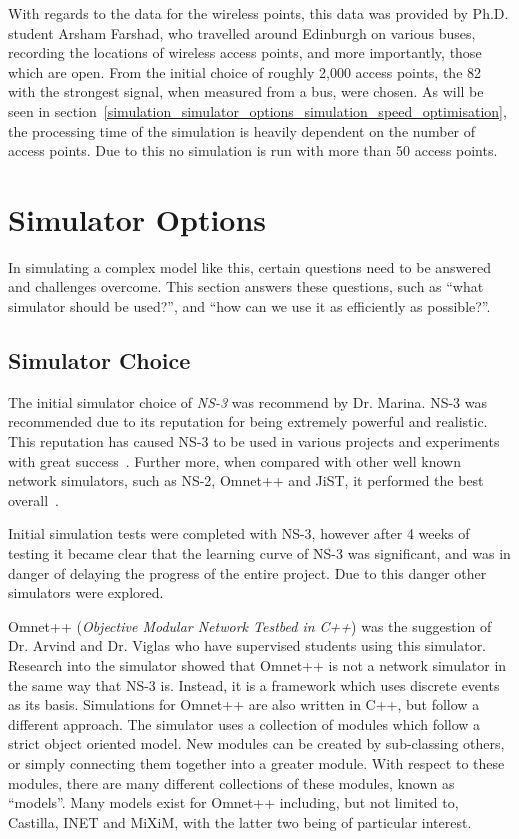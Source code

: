     With regards to the data for the wireless points, this data was provided by Ph.D. student Arsham Farshad, who travelled around Edinburgh on various buses, recording the locations of wireless access points, and more importantly, those which are open. From the initial choice of roughly 2,000 access points, the 82 with the strongest signal, when measured from a bus, were chosen. As will be seen in section~\ref{simulation_simulator_options_simulation_speed_optimisation}, the processing time of the simulation is heavily dependent on the number of access points. Due to this no simulation is run with more than 50 access points. 

    \section{Simulator Options}\label{simulation_simulator_options}

        In simulating a complex model like this, certain questions need to be answered and challenges overcome. This section answers these questions, such as ``what simulator should be used?'', and ``how can we use it as efficiently as possible?''. 

        \subsection{Simulator Choice}\label{simulation_simulator_options_simulator_choice}

            The initial simulator choice of \emph{NS-3} was recommend by Dr. Marina. NS-3 was recommended due to its reputation for being extremely powerful and realistic. This reputation has caused NS-3 to be used in various projects and experiments with great success~\cite{highperformancesimulatorofadhocnetworks}.  Further more, when compared with other well known network simulators, such as NS-2, Omnet++ and JiST, it performed the best overall~\cite{networksimulatorcomparison}. 

            Initial simulation tests were completed with NS-3, however after 4 weeks of testing it became clear that the learning curve of NS-3 was significant, and was in danger of delaying the progress of the entire project. Due to this danger other simulators were explored. 

            Omnet++ (\emph{Objective Modular Network Testbed in C++}) was the suggestion of Dr. Arvind and Dr. Viglas who have supervised students using this simulator. Research into the simulator showed that Omnet++ is not a network simulator in the same way that NS-3 is. Instead, it is a framework which uses discrete events as its basis. Simulations for Omnet++ are also written in C++, but follow a different approach. The simulator uses a collection of modules which follow a strict object oriented model. New modules can be created by sub-classing others, or simply connecting them together into a greater module. With respect to these modules, there are many different collections of these modules, known as ``models''. Many models exist for Omnet++ including, but not limited to, Castilla, INET and MiXiM, with the latter two being of particular interest. 

